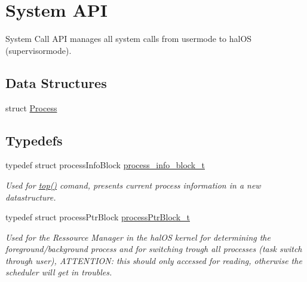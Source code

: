 \hypertarget{group___h_s_y_s_t_e_m___a_p_i}{
\section{System API}
\label{group___h_s_y_s_t_e_m___a_p_i}
}
System Call API manages all system calls from usermode to halOS (supervisormode).  


\subsection*{Data Structures}
\begin{CompactItemize}
\item 
struct \hyperlink{struct_process}{Process}
\end{CompactItemize}
\subsection*{Typedefs}
\begin{CompactItemize}
\item 
\hypertarget{group___h_s_y_s_t_e_m___a_p_i_g3be61222bdb3a1adfbf7720dec596851}{
typedef struct processInfoBlock \hyperlink{group___h_s_y_s_t_e_m___a_p_i_g3be61222bdb3a1adfbf7720dec596851}{process\_\-info\_\-block\_\-t}}
\label{group___h_s_y_s_t_e_m___a_p_i_g3be61222bdb3a1adfbf7720dec596851}

\begin{CompactList}\small\item\em Used for \hyperlink{group___s_c_h_e_d_u_l_e_r_g98be6cb7c674631c08f257f0f361bdba}{top()} comand, presents current process information in a new datastructure. \item\end{CompactList}\item 
\hypertarget{group___h_s_y_s_t_e_m___a_p_i_g0c5816d04d0bbc3e6ddab0c6a1ba855a}{
typedef struct processPtrBlock \hyperlink{group___h_s_y_s_t_e_m___a_p_i_g0c5816d04d0bbc3e6ddab0c6a1ba855a}{processPtrBlock\_\-t}}
\label{group___h_s_y_s_t_e_m___a_p_i_g0c5816d04d0bbc3e6ddab0c6a1ba855a}

\begin{CompactList}\small\item\em Used for the Ressource Manager in the halOS kernel for determining the foreground/background process and for switching trough all processes (task switch through user), ATTENTION: this should only accessed for reading, otherwise the scheduler will get in troubles. \item\end{CompactList}\end{CompactItemize}
